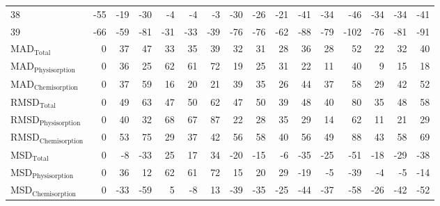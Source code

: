 \begin{longtable}{lrrrrrrrrrrrrrrr}
38 & -55 & -19 & -30 & -4 & -4 & -3 & -30 & -26 & -21 & -41 & -34 & -46 & -34 & -34 & -41 \\
39 & -66 & -59 & -81 & -31 & -33 & -39 & -76 & -76 & -62 & -88 & -79 & -102 & -76 & -81 & -91 \\
MAD$_{\text{Total}}$ & 0 & 37 & 47 & 33 & 35 & 39 & 32 & 31 & 28 & 36 & 28 & 52 & 22 & 32 & 40 \\
MAD$_{\text{Physisorption}}$ & 0 & 36 & 25 & 62 & 61 & 72 & 19 & 25 & 31 & 22 & 11 & 40 & 9 & 15 & 18 \\
MAD$_{\text{Chemisorption}}$ & 0 & 37 & 59 & 16 & 20 & 21 & 39 & 35 & 26 & 44 & 37 & 58 & 29 & 42 & 52 \\
RMSD$_{\text{Total}}$ & 0 & 49 & 63 & 47 & 50 & 62 & 47 & 50 & 39 & 48 & 40 & 80 & 35 & 48 & 58 \\
RMSD$_{\text{Physisorption}}$ & 0 & 40 & 32 & 68 & 67 & 87 & 22 & 28 & 35 & 29 & 14 & 62 & 11 & 21 & 29 \\
RMSD$_{\text{Chemisorption}}$ & 0 & 53 & 75 & 29 & 37 & 42 & 56 & 58 & 40 & 56 & 49 & 88 & 43 & 58 & 69 \\
MSD$_{\text{Total}}$ & 0 & -8 & -33 & 25 & 17 & 34 & -20 & -15 & -6 & -35 & -25 & -51 & -18 & -29 & -38 \\
MSD$_{\text{Physisorption}}$ & 0 & 36 & 12 & 62 & 61 & 72 & 15 & 20 & 29 & -19 & -5 & -39 & -4 & -5 & -14 \\
MSD$_{\text{Chemisorption}}$ & 0 & -33 & -59 & 5 & -8 & 13 & -39 & -35 & -25 & -44 & -37 & -58 & -26 & -42 & -52 \\
\bottomrule
\end{longtable}